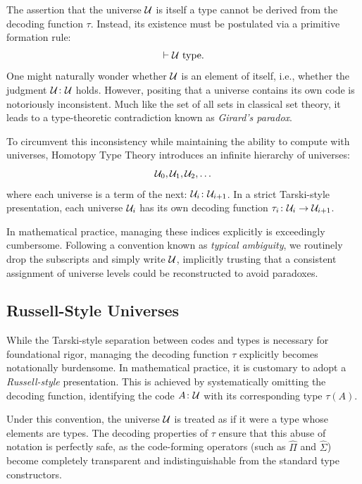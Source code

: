 \begin{rem}
    The assertion that the universe $\mathcal U$ is itself a type cannot be derived from the decoding function $\tau$. Instead, its existence must be postulated via a primitive formation rule:
    \[
        \vdash \mathcal U \text{ type}.
    \]
    One might naturally wonder whether $\mathcal U$ is an element of itself, i.e., whether the judgment $\univ\colon\univ$ holds. However, positing that a universe contains its own code is notoriously inconsistent. Much like the set of all sets in classical set theory, it leads to a type-theoretic contradiction known as \textsl{Girard's paradox}.
    
    To circumvent this inconsistency while maintaining the ability to compute with universes, Homotopy Type Theory introduces an infinite hierarchy of universes:
    \[
        \mathcal U_0, \mathcal U_1, \mathcal U_2, \dots
    \]
    where each universe is a term of the next: $\univ_i\colon\univ_{i+1}$. In a strict Tarski-style presentation, each universe $\mathcal U_i$ has its own decoding function $\tau_i\colon\univ_i\to\univ_{i+1}$.
    
    In mathematical practice, managing these indices explicitly is exceedingly cumbersome. Following a convention known as \textsl{typical ambiguity}, we routinely drop the subscripts and simply write $\mathcal U$, implicitly trusting that a consistent assignment of universe levels could be reconstructed to avoid paradoxes.
\end{rem}

\subsection*{Russell-Style Universes}

While the Tarski-style separation between codes and types is necessary for foundational rigor, managing the decoding function $\tau$ explicitly becomes notationally burdensome. In mathematical practice, it is customary to adopt a \textsl{Russell-style} presentation. This is achieved by systematically omitting the decoding function, identifying the code $A\colon\univ$ with its corresponding type $\tau(A)$.

Under this convention, the universe $\mathcal U$ is treated as if it were a type whose elements are types. The decoding properties of $\tau$ ensure that this abuse of notation is perfectly safe, as the code-forming operators (such as $\hat{\Pi}$ and $\hat{\Sigma}$) become completely transparent and indistinguishable from the standard type constructors. 

